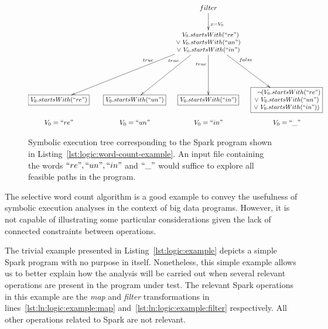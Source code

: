 \begin{figure}[t]
	\[\xymatrix@C=0.3em @R=0.8em{ 
		& & & & & \ar[dd]^<(0.4){x = V_{0}} filter & & \\
		& & & & & & & \\
		& & & & & \ar@{}[llllldddd]_<(0.2){true} \ar[llllldddd]
		\ar@{}[lldddd]_<(0.2){true} \ar[lldddd]
		\ar@{}[dddd]_<(0.2){true} \ar[dddd]
		\txt{\small $~~V_{0}.startsWith(``re")$ \\ 
			\small $\lor ~V_{0}.startsWith(``un")$ \\
			\small $\lor ~V_{0}.startsWith(``in")$} 
		\ar[rrdddd] \ar@{}[rrdddd]^<(0.2){false} & & \\
		& & & & & & & \\
		& & & & & & & \\
		& & & & & & & \\
		*+[F] \txt{\small $V_{0}.startsWith(``re")$} & & &
		*+[F] \txt{\small $V_{0}.startsWith(``un")$} & & 
		*+[F] \txt{\small $V_{0}.startsWith(``in")$} & &
		*+[F] \txt{\small $~~\lnot(V_{0}.startsWith(``re")$ \\ 
			\small $\lor ~V_{0}.startsWith(``un")$ \\
			\small $\lor ~V_{0}.startsWith(``in"))$} \\
		V_{0} = ``re" & & & V_{0} = ``un" & &  V_{0} = ``in" & & V_{0} = ``\_" \\
	} \]
	\caption[Symbolic Execution Tree of the Selective Word Count Example]{Symbolic execution tree corresponding to the Spark program shown in Listing~\ref{lst:logic:word-count-example}. An input file containing the words $``re",``un",``in"$ and $``\_"$ would suffice to explore all feasible paths in the program.}
	\label{fig:logic:symbolic-spark-word-count-example}
\end{figure}


The selective word count algorithm is a good example to convey the usefulness of symbolic execution analyses in the context of big data programs. However, it is not capable of illustrating some particular considerations given the lack of connected constraints between operations. 

The trivial example presented in Listing~\ref{lst:logic:example} depicts a simple Spark program with no purpose in itself. Nonetheless, this simple example allows us to better explain how the analysis will be carried out when several relevant operations are present in the program under test. The relevant Spark operations in this example are the \textit{map} and \textit{filter} transformations in lines~\ref{lst:ln:logic:example:map} and~\ref{lst:ln:logic:example:filter} respectively. All other operations related to Spark are not relevant.

